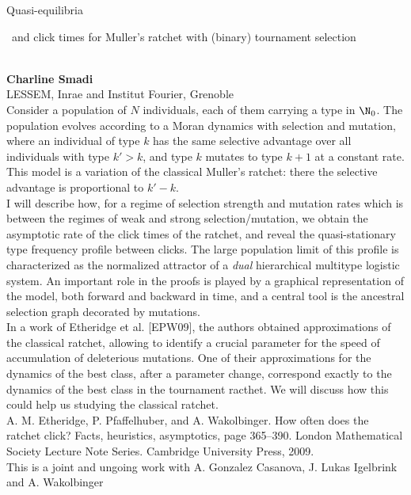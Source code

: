 \documentclass[12pt,a4paper]{article}
\newcommand{\ZAbst}{\rule[-1ex]{0pt}{2ex}\ } %
\begin{document}
\noindent
{\Large 
Quasi-equilibria\ZAbst and click times for Muller’s ratchet with (binary) tournament selection}\\[1ex]
{\large\textbf{Charline Smadi}\\[1ex] LESSEM, Inrae and Institut Fourier, Grenoble}\\[2ex]
Consider a population of $N$ individuals, each of them carrying a type in $\N_0$. The population evolves according to a Moran dynamics with selection and mutation, where an individual of type $k$ has the same selective advantage over all individuals with type $k′ > k$, and type $k$ mutates to type $k + 1$ at a constant rate. This model is a variation of the classical Muller’s ratchet: there the selective advantage is proportional to $k′ − k$.  
\\
I will describe how, for a regime of selection strength and mutation rates which is between the regimes of weak and strong selection/mutation, we obtain the asymptotic rate of the click times of the ratchet, and reveal the quasi-stationary type frequency profile between clicks. The large population limit of this profile is characterized as the normalized attractor of a {\em dual} hierarchical multitype logistic system. An important role in the proofs is played by a graphical representation of the model, both forward and backward in time, and a central tool is the ancestral selection graph decorated by mutations.
\\
In a work of Etheridge  et al. [EPW09], the authors obtained approximations of the classical ratchet, allowing to identify a crucial parameter for the speed of accumulation of deleterious mutations. One of their approximations for the dynamics of the best class, after a parameter change, correspond exactly to the dynamics of the best class in the tournament racthet. We will discuss how this could help us studying the classical ratchet.
\\
[EPW09] A. M. Etheridge, P. Pfaffelhuber, and A. Wakolbinger. How often does the ratchet click? Facts, heuristics, asymptotics, page 365–390. London Mathematical Society Lecture Note Series. Cambridge University Press, 2009.
\\
This is a joint and ungoing work with A. Gonzalez Casanova, J. Lukas Igelbrink and A. Wakolbinger


\bigskip \bigskip  %
\end{document}
